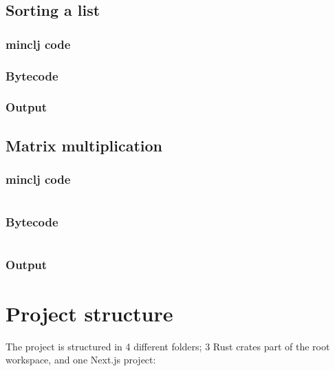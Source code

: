 \documentclass[11pt]{scrreprt}
\begin{document}
\section{Sorting a list}
\subsection{minclj code}

\subsection{Bytecode}

\subsection{Output}

\section{Matrix multiplication}
\subsection{minclj code}
\inputminted{clojure}{/home/mario/git/MarioJim/miniclj/examples/matrix_multiplication.clj}

\subsection{Bytecode}
\inputminted{text}{/home/mario/git/MarioJim/miniclj/examples/matrix_multiplication.mclj}

\subsection{Output}

\chapter{Project structure}
The project is structured in 4 different folders; 3 Rust crates part of the root workspace, and one Next.js project:
\end{document}
